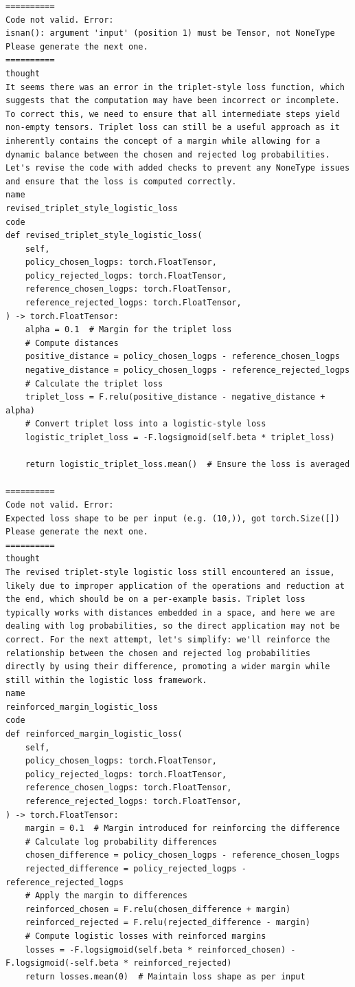 \documentclass{article}
\theoremstyle{plain}
\theoremstyle{definition}
\theoremstyle{remark}
\begin{document}
\begin{lstlisting}
==========
Code not valid. Error:
isnan(): argument 'input' (position 1) must be Tensor, not NoneType
Please generate the next one.
==========
thought
It seems there was an error in the triplet-style loss function, which suggests that the computation may have been incorrect or incomplete. To correct this, we need to ensure that all intermediate steps yield non-empty tensors. Triplet loss can still be a useful approach as it inherently contains the concept of a margin while allowing for a dynamic balance between the chosen and rejected log probabilities. Let's revise the code with added checks to prevent any NoneType issues and ensure that the loss is computed correctly.
name
revised_triplet_style_logistic_loss
code
def revised_triplet_style_logistic_loss(
    self,
    policy_chosen_logps: torch.FloatTensor,
    policy_rejected_logps: torch.FloatTensor,
    reference_chosen_logps: torch.FloatTensor,
    reference_rejected_logps: torch.FloatTensor,
) -> torch.FloatTensor:
    alpha = 0.1  # Margin for the triplet loss
    # Compute distances
    positive_distance = policy_chosen_logps - reference_chosen_logps
    negative_distance = policy_chosen_logps - reference_rejected_logps
    # Calculate the triplet loss
    triplet_loss = F.relu(positive_distance - negative_distance + alpha)
    # Convert triplet loss into a logistic-style loss
    logistic_triplet_loss = -F.logsigmoid(self.beta * triplet_loss)

    return logistic_triplet_loss.mean()  # Ensure the loss is averaged
    
==========
Code not valid. Error:
Expected loss shape to be per input (e.g. (10,)), got torch.Size([])
Please generate the next one.
==========
thought
The revised triplet-style logistic loss still encountered an issue, likely due to improper application of the operations and reduction at the end, which should be on a per-example basis. Triplet loss typically works with distances embedded in a space, and here we are dealing with log probabilities, so the direct application may not be correct. For the next attempt, let's simplify: we'll reinforce the relationship between the chosen and rejected log probabilities directly by using their difference, promoting a wider margin while still within the logistic loss framework.
name
reinforced_margin_logistic_loss
code
def reinforced_margin_logistic_loss(
    self,
    policy_chosen_logps: torch.FloatTensor,
    policy_rejected_logps: torch.FloatTensor,
    reference_chosen_logps: torch.FloatTensor,
    reference_rejected_logps: torch.FloatTensor,
) -> torch.FloatTensor:
    margin = 0.1  # Margin introduced for reinforcing the difference
    # Calculate log probability differences
    chosen_difference = policy_chosen_logps - reference_chosen_logps
    rejected_difference = policy_rejected_logps - reference_rejected_logps
    # Apply the margin to differences
    reinforced_chosen = F.relu(chosen_difference + margin)
    reinforced_rejected = F.relu(rejected_difference - margin)
    # Compute logistic losses with reinforced margins
    losses = -F.logsigmoid(self.beta * reinforced_chosen) - F.logsigmoid(-self.beta * reinforced_rejected)
    return losses.mean(0)  # Maintain loss shape as per input
    

\end{lstlisting}
\end{document}
